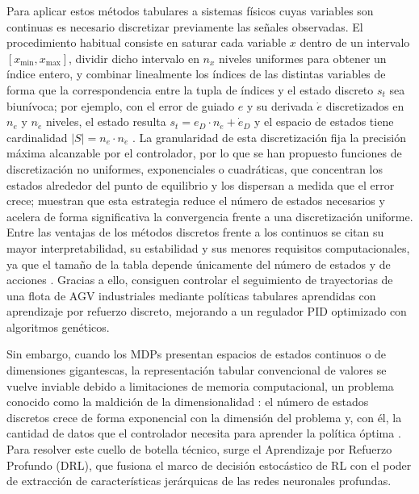 Para aplicar estos métodos tabulares a sistemas físicos cuyas variables son continuas es necesario discretizar previamente las señales observadas. El procedimiento habitual consiste en saturar cada variable $x$ dentro de un intervalo $[x_{\min}, x_{\max}]$, dividir dicho intervalo en $n_x$ niveles uniformes para obtener un índice entero, y combinar linealmente los índices de las distintas variables de forma que la correspondencia entre la tupla de índices y el estado discreto $s_t$ sea biunívoca; por ejemplo, con el error de guiado $e$ y su derivada $\dot{e}$ discretizados en $n_e$ y $n_{\dot{e}}$ niveles, el estado resulta $s_t = e_D \cdot n_{\dot{e}} + \dot{e}_D$ y el espacio de estados tiene cardinalidad $|S| = n_e \cdot n_{\dot{e}}$ \citep{sierragarcia2024combining, sierragarcia2024federated}. La granularidad de esta discretización fija la precisión máxima alcanzable por el controlador, por lo que se han propuesto funciones de discretización no uniformes, exponenciales o cuadráticas, que concentran los estados alrededor del punto de equilibrio y los dispersan a medida que el error crece; \citet{gilmacia2025exponential} muestran que esta estrategia reduce el número de estados necesarios y acelera de forma significativa la convergencia frente a una discretización uniforme. Entre las ventajas de los métodos discretos frente a los continuos se citan su mayor interpretabilidad, su estabilidad y sus menores requisitos computacionales, ya que el tamaño de la tabla depende únicamente del número de estados y de acciones \citep{gilmacia2025exponential, sierragarcia2024federated}. Gracias a ello, \citet{sierragarcia2024federated} consiguen controlar el seguimiento de trayectorias de una flota de AGV industriales mediante políticas tabulares aprendidas con aprendizaje por refuerzo discreto, mejorando a un regulador PID optimizado con algoritmos genéticos.

Sin embargo, cuando los MDPs presentan espacios de estados continuos o de dimensiones gigantescas, la representación tabular convencional de valores se vuelve inviable debido a limitaciones de memoria computacional, un problema conocido como la maldición de la dimensionalidad \citep{shakya2023reinforcement}: el número de estados discretos crece de forma exponencial con la dimensión del problema y, con él, la cantidad de datos que el controlador necesita para aprender la política óptima \citep{gilmacia2025exponential}. Para resolver este cuello de botella técnico, surge el Aprendizaje por Refuerzo Profundo (DRL), que fusiona el marco de decisión estocástico de RL con el poder de extracción de características jerárquicas de las redes neuronales profundas.

